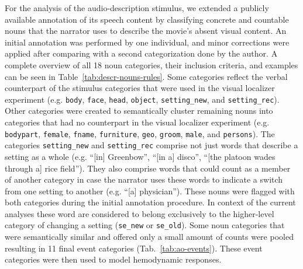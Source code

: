 \documentclass[english]{article}
\begin{document}
For the analysis of the audio-description stimulus, we extended a publicly available annotation
of its speech content \citep{hausler2021studyforrest} by classifying
concrete and countable nouns that the narrator uses to describe the movie's absent visual content.
An initial annotation was performed by one individual,
and minor corrections were applied after comparing with a second categorization
done by the author.
A complete overview of all 18 noun categories, their inclusion criteria, and examples
can be seen in Table~\ref{tab:descr-nouns-rules}.
Some categories reflect the verbal counterpart of the stimulus categories that
were used in the visual localizer experiment (e.g. \texttt{body}, \texttt{face},
\texttt{head}, \texttt{object}, \texttt{setting\_new}, and
\texttt{setting\_rec}).
Other categories were created to semantically cluster remaining nouns into
categories that had no counterpart in the visual localizer experiment (e.g.
\texttt{bodypart}, \texttt{female}, \texttt{fname}, \texttt{furniture},
\texttt{geo}, \texttt{groom}, \texttt{male}, and \texttt{persons}).
The categories \texttt{setting\_new} and \texttt{setting\_rec} comprise not just
words that describe a setting as a whole (e.g. ``[in] Greenbow'', ``[in a]
disco'', ``[the platoon wades through a] rice field''). They also comprise words
that could count as a member of another category in case the narrator uses
these words to indicate a switch from one setting to another (e.g. ``[a]
physician'').
These nouns were flagged with both categories during the initial annotation
procedure. In context of the current analyses these word are considered to
belong exclusively to the higher-level category of changing a setting
(\texttt{se\_new} or \texttt{se\_old}).
Some noun categories that were semantically similar and offered only a small
amount of counts were pooled resulting in 11 final event categories (Tab.~\ref{tab:ao-events}).
These event categories were then used to model hemodynamic
responses.
\end{document}
